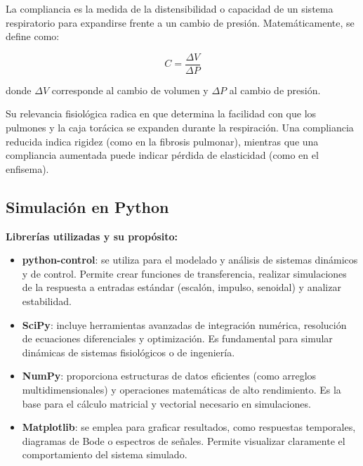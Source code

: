 \documentclass[journal]{IEEEtran}
\begin{document}
La compliancia es la medida de la distensibilidad o capacidad de un sistema respiratorio para expandirse frente a un cambio de presión. Matemáticamente, se define como:

\begin{equation}
    C = \frac{\Delta V}{\Delta P}
\end{equation}

donde $\Delta V$ corresponde al cambio de volumen y $\Delta P$ al cambio de presión.

Su relevancia fisiológica radica en que determina la facilidad con que los pulmones y la caja torácica se expanden durante la respiración. Una compliancia reducida indica rigidez (como en la fibrosis pulmonar), mientras que una compliancia aumentada puede indicar pérdida de elasticidad (como en el enfisema).


\subsection{Simulación en Python}

\noindent
\textbf{Librerías utilizadas y su propósito:}

\begin{itemize}
    \item \textbf{python-control}: se utiliza para el modelado y análisis de sistemas dinámicos y de control. Permite crear funciones de transferencia, realizar simulaciones de la respuesta a entradas estándar (escalón, impulso, senoidal) y analizar estabilidad.
    
    \item \textbf{SciPy}: incluye herramientas avanzadas de integración numérica, resolución de ecuaciones diferenciales y optimización. Es fundamental para simular dinámicas de sistemas fisiológicos o de ingeniería.
    
    \item \textbf{NumPy}: proporciona estructuras de datos eficientes (como arreglos multidimensionales) y operaciones matemáticas de alto rendimiento. Es la base para el cálculo matricial y vectorial necesario en simulaciones.
    
    \item \textbf{Matplotlib}: se emplea para graficar resultados, como respuestas temporales, diagramas de Bode o espectros de señales. Permite visualizar claramente el comportamiento del sistema simulado.

\end{itemize}
\end{document}
